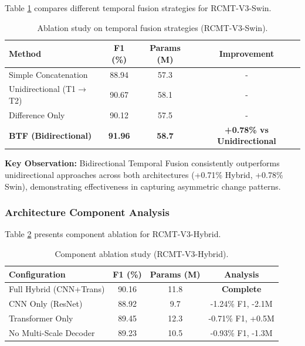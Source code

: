 \documentclass[journal]{IEEEtran}
\begin{document}
{Table \ref{tab:fusion_swin} compares different temporal fusion strategies for RCMT-V3-Swin.

\begin{table}[ht]
\centering
\caption{Ablation study on temporal fusion strategies (RCMT-V3-Swin).}
\label{tab:fusion_swin}
\begin{tabular}{lccc}
\toprule
\textbf{Method} & \textbf{F1 (\%)} & \textbf{Params (M)} & \textbf{Improvement} \\
\midrule
    Simple Concatenation & 88.94 & 57.3 & - \\
    Unidirectional (T1$\rightarrow$T2) & 90.67 & 58.1 & - \\
    Difference Only & 90.12 & 57.5 & - \\
    \textbf{BTF (Bidirectional)} & \textbf{91.96} & \textbf{58.7} & \textbf{+0.78\% vs Unidirectional} \\
\bottomrule
\end{tabular}
\end{table}

\textbf{Key Observation:} Bidirectional Temporal Fusion consistently outperforms unidirectional approaches across both architectures (+0.71\% Hybrid, +0.78\% Swin), demonstrating effectiveness in capturing asymmetric change patterns.

\subsubsection{Architecture Component Analysis}

Table \ref{tab:arch_hybrid} presents component ablation for RCMT-V3-Hybrid.

\begin{table}[ht]
\centering
\caption{Component ablation study (RCMT-V3-Hybrid).}
\label{tab:arch_hybrid}
\begin{tabular}{lccc}
\toprule
\textbf{Configuration} & \textbf{F1 (\%)} & \textbf{Params (M)} & \textbf{Analysis} \\
\midrule
    Full Hybrid (CNN+Trans) & 90.16 & 11.8 & \textbf{Complete} \\
    CNN Only (ResNet) & 88.92 & 9.7 & -1.24\% F1, -2.1M \\
    Transformer Only & 89.45 & 12.3 & -0.71\% F1, +0.5M \\
    No Multi-Scale Decoder & 89.23 & 10.5 & -0.93\% F1, -1.3M \\
\bottomrule
\end{tabular}
\end{table}

}
\end{document}
